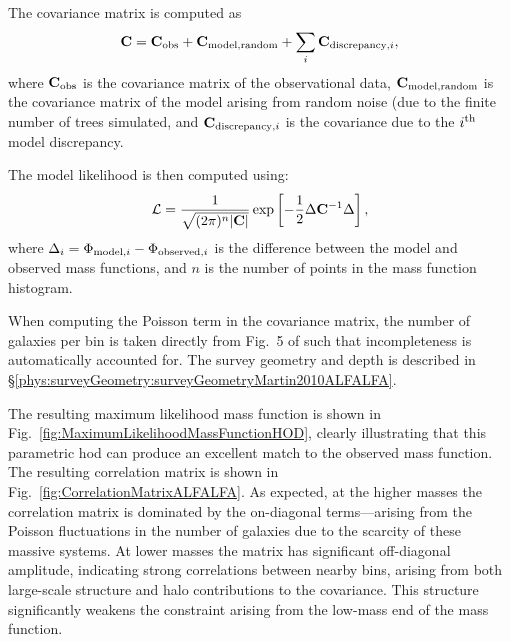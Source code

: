 The covariance matrix is computed as
\begin{equation}
 {\bf C} = {\bf C}_{\rm obs} + {\bf C}_{\rm model,random} + \sum_i {\bf C}_{{\rm discrepancy}, i},
\end{equation}
where ${\bf C}_{\rm obs}$ is the covariance matrix of the observational data, ${\bf C}_{\rm model,random}$ is the covariance matrix of the model arising from random noise (due to the finite number of trees simulated, and ${\bf C}_{{\rm discrepancy}, i}$ is the covariance due to the $i^{\rm th}$ model discrepancy.

The model likelihood is then computed using:
\begin{equation}
 \mathcal{L} = {1 \over \sqrt{(2 \pi)^n |{\bf C}|}} \exp\left[ -{1\over 2} \Delta {\bf C}^{-1} \Delta \right],
\end{equation}
where $\Delta_i = \Phi_{{\rm model}, i} - \Phi_{{\rm observed}, i}$ is the difference between the model and observed mass functions, and $n$ is the number of points in the mass function histogram.

When computing the Poisson term in the covariance matrix, the number of galaxies per bin is taken directly from Fig.~5 of \cite{martin_arecibo_2010} such that incompleteness is automatically accounted for. The survey geometry and depth is described in \S\ref{phys:surveyGeometry:surveyGeometryMartin2010ALFALFA}.

The resulting maximum likelihood mass function is shown in Fig.~\ref{fig:MaximumLikelihoodMassFunctionHOD}, clearly illustrating that this parametric \gls{hod} can produce an excellent match to the observed mass function. The resulting correlation matrix is shown in Fig.~\ref{fig:CorrelationMatrixALFALFA}. As expected, at the higher masses the correlation matrix is dominated by the on-diagonal terms---arising from the Poisson fluctuations in the number of galaxies due to the scarcity of these massive systems. At lower masses the matrix has significant off-diagonal amplitude, indicating strong correlations between nearby bins, arising from both large-scale structure and halo contributions to the covariance. This structure significantly weakens the constraint arising from the low-mass end of the mass function.

